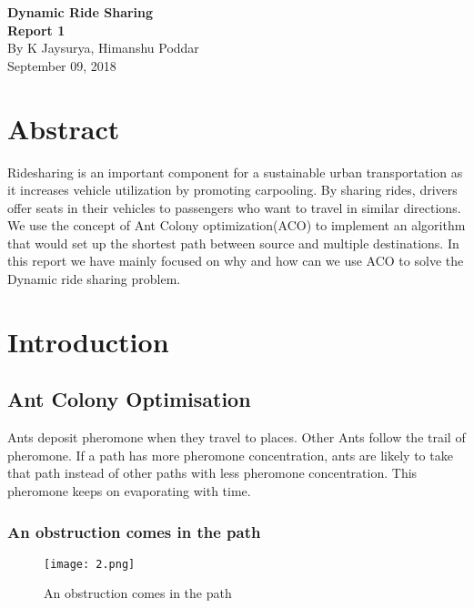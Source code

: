 \documentclass[11pt]{article}
\begin{document}
\begin{center}
\vspace*{1cm}
    \huge{\textbf{Dynamic Ride Sharing}} \\
    \Large{\textbf{Report 1}} \\
    By K Jaysurya, Himanshu Poddar\\
    September 09, 2018 \\
\end{center}

\section{Abstract}
Ridesharing is an important component for a sustainable urban transportation as it increases vehicle utilization by promoting carpooling. By sharing rides, drivers offer seats in their vehicles to passengers who want to travel in similar directions. We use the concept of Ant Colony optimization(ACO) to implement an algorithm that would set up the shortest path between source and multiple destinations. In this report we have mainly focused on why and how can we use ACO to solve the Dynamic ride sharing problem.

\section{Introduction}
\subsection{Ant Colony Optimisation}
Ants deposit pheromone when they travel to places. Other Ants follow the trail of pheromone. If a path has more pheromone concentration, ants are likely to take that path instead of other paths with less pheromone concentration. This pheromone keeps on evaporating with time.
\subsubsection{An obstruction comes in the path}
\begin{figure}[H]
\centering
\texttt{[image: 2.png]}
\caption{An obstruction comes in the path}
\label{fig:bar}
\end{figure}
\end{document}
